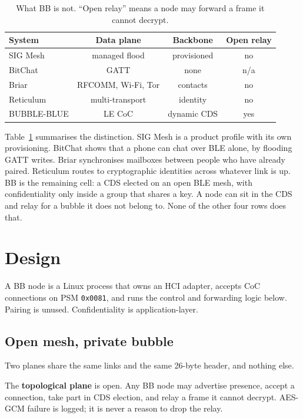 \documentclass[conference,10pt]{IEEEtran}
\begin{document}
\begin{table}[t]
\centering
\caption{What BB is not. ``Open relay'' means a node may forward a frame
it cannot decrypt.}
\label{tab:not}
\begin{tabular}{@{}lccc@{}}
\toprule
System & Data plane & Backbone & Open relay \\
\midrule
SIG Mesh~\cite{mesh-profile} & managed flood & provisioned & no \\
BitChat~\cite{bitchat} & GATT & none & n/a \\
Briar~\cite{briar} & RFCOMM, Wi-Fi, Tor & contacts & no \\
Reticulum~\cite{reticulum} & multi-transport & identity & no \\
BUBBLE-BLUE & LE CoC & dynamic CDS & yes \\
\bottomrule
\end{tabular}
\end{table}

Table~\ref{tab:not} summarises the distinction. SIG Mesh is a product profile with its own provisioning.
BitChat shows that a phone can chat over BLE alone, by flooding GATT
writes. Briar synchronises mailboxes between people who have already
paired. Reticulum routes to cryptographic identities across whatever
link is up. BB is the remaining cell: a CDS elected on an open BLE mesh,
with confidentiality only inside a group that shares a key. A node can
sit in the CDS and relay for a bubble it does not belong to. None of the
other four rows does that.

\section{Design}
\label{sec:design}

A BB node is a Linux process that owns an HCI adapter, accepts CoC
connections on PSM \texttt{0x0081}, and runs the control and forwarding
logic below. Pairing is unused. Confidentiality is application-layer.

\subsection{Open mesh, private bubble}

Two planes share the same links and the same 26-byte header, and nothing
else.

The \textbf{topological plane} is open. Any BB node may advertise
presence, accept a connection, take part in CDS election, and relay a
frame it cannot decrypt. AES-GCM failure is logged; it is never a reason
to drop the relay.
\end{document}

